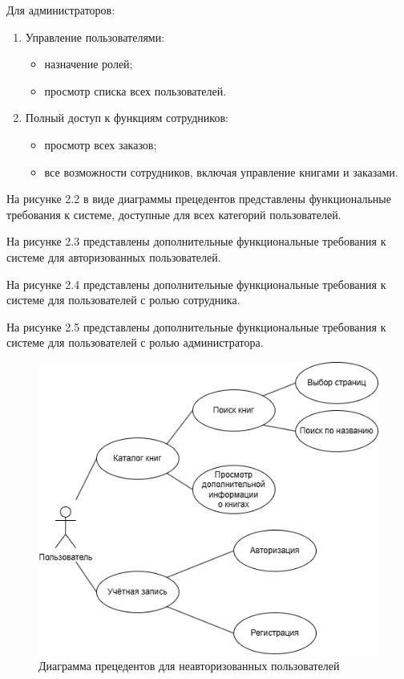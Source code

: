 Для администраторов:
\begin{enumerate}
	\item Управление пользователями:
	\begin{itemize}
		\item назначение ролей;
		\item просмотр списка всех пользователей.
	\end{itemize}
	\item Полный доступ к функциям сотрудников:
	\begin{itemize}
		\item просмотр всех заказов;
		\item все возможности сотрудников, включая управление книгами и заказами.
	\end{itemize}
\end{enumerate}

На рисунке 2.2 в виде диаграммы прецедентов представлены функциональные требования к системе, доступные для всех категорий пользователей.

На рисунке 2.3 представлены дополнительные функциональные требования к системе для авторизованных пользователей.

На рисунке 2.4 представлены дополнительные функциональные требования к системе для пользователей с ролью сотрудника.

На рисунке 2.5 представлены дополнительные функциональные требования к системе для пользователей с ролью администратора.

\begin{figure}[H]
	\centering
	\includegraphics[width=0.7\linewidth]{"images/Все_пользователи"}
	\caption{Диаграмма прецедентов для неавторизованных пользователей}
	\label{fig:--}
\end{figure}

